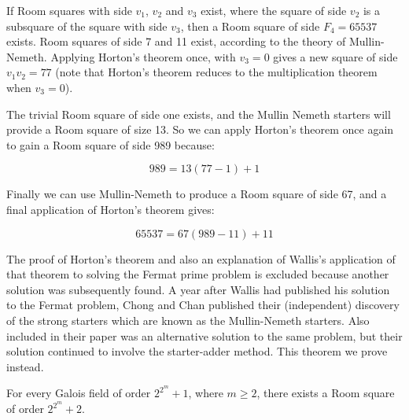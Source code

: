 \begin{example}
If Room squares with side $v_1$, $v_2$ and $v_3$ exist, where the square of side $v_2$ is a subsquare of the square with side $v_3$, then a Room square of side $F_4 = 65537$ exists.
Room squares of side 7 and 11 exist, according to the theory of Mullin-Nemeth.
Applying Horton’s theorem once, with $v_3 = 0$ gives a new square of side $v_1v_2 = 77$ (note that Horton’s theorem reduces to the multiplication theorem when $v_3 = 0$).

The trivial Room square of side one exists, and the Mullin Nemeth starters will provide a Room square of size 13.
So we can apply Horton’s theorem once again to gain a Room square of side 989 because:

\begin{equation}
989 = 13(77 - 1) + 1
\end{equation}

Finally we can use Mullin-Nemeth to produce a Room square of side 67, and a final application of Horton’s theorem gives:

\begin{equation}
65537 = 67(989 - 11) + 11
\end{equation}
\end{example}

The proof of Horton's theorem and also an explanation of Wallis's application of that theorem to solving the Fermat prime problem is excluded because another solution was subsequently found.
A year after Wallis had published his solution to the Fermat problem, Chong and Chan published their (independent) discovery of the strong starters which are known as the Mullin-Nemeth starters.
Also included in their paper was an alternative solution to the same problem, but their solution continued to involve the starter-adder method.
This theorem we prove instead.

\begin{theorem}
\label{thm:chong-chan}
For every Galois field of order $2^{2^m} + 1$, where $m \geq 2$, there exists a Room square of order $2^{2^m} + 2$.
\end{theorem}

